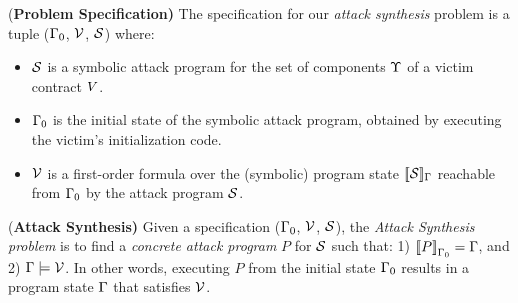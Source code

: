 \begin{definition}{{(\bf Problem Specification)}}
The specification for our \emph{attack synthesis} problem is a tuple ($\Gamma_0$, $\mathcal{V}$, $\mathcal{S}$) where:
\begin{itemize}
\item $\mathcal{S}$ is a symbolic attack program for the set of components $\Upsilon$
of a victim contract $V$.
\item $\Gamma_0$ is the initial state of the symbolic attack program, obtained by executing the victim's initialization code.
\item $\mathcal{V}$ is a first-order formula over the (symbolic) program state
${[\![\mathcal{S}]\!]_\Gamma}$ reachable from $\Gamma_0$ by the attack program $\mathcal{S}$.
\end{itemize}
\end{definition}
\begin{definition}{{(\bf Attack Synthesis)}}
Given a specification ($\Gamma_0$, $\mathcal{V}$, $\mathcal{S}$), the 
\emph{Attack Synthesis problem} is to find a \emph{concrete attack program} $P$ for
$\mathcal{S}$ such that: 1) ${[\![ P ]\!]}_{\Gamma_0} = \Gamma$, and 2) $\Gamma \models \mathcal{V}$.
In other words, executing 
$P$ from the initial state $\Gamma_0$
results in a program state $\Gamma$ that satisfies $\mathcal{V}$.
\end{definition}
